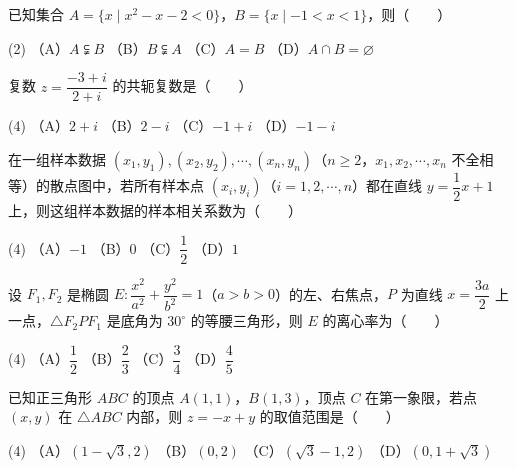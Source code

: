 \begin{question}
已知集合 $A=\{x\mid x^2-x-2<0\}$，$B=\{x\mid -1<x<1\}$，则\mbox{（　　）}

\begin{gkopts}(2)
\task （A）$A\subsetneqq B$
\task （B）$B\subsetneqq A$
\task （C）$A=B$
\task （D）$A\cap B=\varnothing$
\end{gkopts}

\end{question}
\begin{question}
复数 $z=\dfrac{-3+i}{2+i}$ 的共轭复数是\mbox{（　　）}

\begin{gkopts}(4)
\task （A）$2+i$
\task （B）$2-i$
\task （C）$-1+i$
\task （D）$-1-i$
\end{gkopts}

\end{question}
\begin{question}
在一组样本数据 $(x_1,y_1),(x_2,y_2),\cdots,(x_n,y_n)$（$n\geqslant2$，$x_1,x_2,\cdots,x_n$ 不全相等）的散点图中，若所有样本点 $(x_i,y_i)$（$i=1,2,\cdots,n$）都在直线 $y=\dfrac12x+1$ 上，则这组样本数据的样本相关系数为\mbox{（　　）}

\begin{gkopts}(4)
\task （A）$-1$
\task （B）$0$
\task （C）$\dfrac12$
\task （D）$1$
\end{gkopts}

\end{question}
\begin{question}
设 $F_1,F_2$ 是椭圆 $E:\dfrac{x^2}{a^2}+\dfrac{y^2}{b^2}=1$（$a>b>0$）的左、右焦点，$P$ 为直线 $x=\dfrac{3a}{2}$ 上一点，$\triangle F_2PF_1$ 是底角为 $30^\circ$ 的等腰三角形，则 $E$ 的离心率为\mbox{（　　）}

\begin{gkopts}(4)
\task （A）$\dfrac12$
\task （B）$\dfrac23$
\task （C）$\dfrac34$
\task （D）$\dfrac45$
\end{gkopts}

\end{question}
\begin{question}
已知正三角形 $ABC$ 的顶点 $A(1,1)$，$B(1,3)$，顶点 $C$ 在第一象限，若点 $(x,y)$ 在 $\triangle ABC$ 内部，则 $z=-x+y$ 的取值范围是\mbox{（　　）}

\begin{gkopts}(4)
\task （A）$(1-\sqrt3,2)$
\task （B）$(0,2)$
\task （C）$(\sqrt3-1,2)$
\task （D）$(0,1+\sqrt3)$
\end{gkopts}

\Needspace{0.4\textheight}
\end{question}
